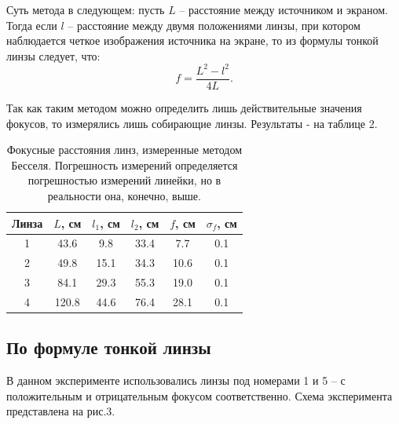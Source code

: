 \documentclass[a4paper, 14pt]{extarticle}%
\newcommand\ECaption[1]{%
     \captionsetup{font=footnotesize}%
     \caption{#1}}
\begin{document}
Суть метода в следующем: пусть $L$ -- расстояние между источником и экраном. Тогда если $l$ -- расстояние между двумя положениями линзы, при котором наблюдается четкое изображения источника на экране, то из формулы тонкой линзы следует, что:
\begin{equation}
f = \dfrac{L^2 - l^2}{4L}.
\end{equation}

Так как таким методом можно определить лишь действительные значения фокусов, то измерялись лишь собирающие линзы. Результаты - на таблице 2.

\begin{table}[h!]
\begin{center}
\begin{tabular}{|c|c|c|c|c|c|}
\hline
\rowcolor[HTML]{9698ED} 
Линза & $L$, см & $l_1$, см & $l_2$, см & $f$, см & $\sigma_f$, см \\ \hline
1     & 43.6    & 9.8       & 33.4      & 7.7     & 0.1            \\ \hline
\rowcolor[HTML]{9698ED} 
2     & 49.8    & 15.1      & 34.3      & 10.6    & 0.1            \\ \hline
3     & 84.1    & 29.3      & 55.3      & 19.0    & 0.1            \\ \hline
\rowcolor[HTML]{9698ED} 
4     & 120.8   & 44.6      & 76.4      & 28.1    & 0.1            \\ \hline
\end{tabular}
\ECaption{Фокусные расстояния линз, измеренные методом Бесселя. Погрешность измерений определяется погрешностью измерений линейки, но в реальности она, конечно, выше.}
\end{center}
\end{table}

\subsection{По формуле тонкой линзы}

В данном эксперименте использовались линзы под номерами 1 и 5 -- с положительным и отрицательным фокусом соответственно. Схема эксперимента представлена на рис.3.
\end{document}
